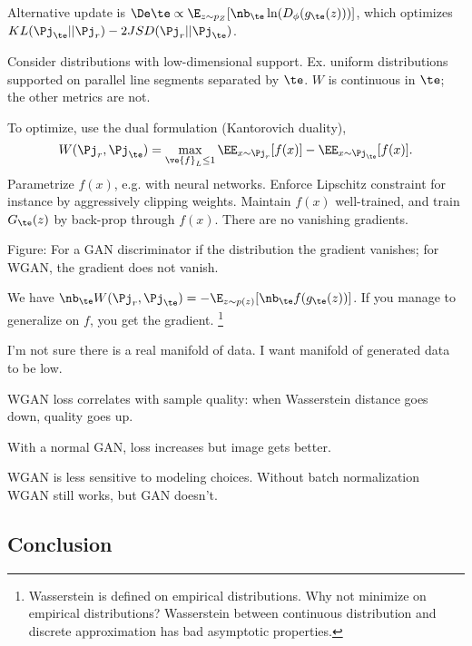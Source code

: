 Alternative update is $\De \te \propto \E_{z\sim p_Z} [\nb_\te \ln(D_\phi(g_\te(z)))]$, which optimizes $KL(\Pj_\te||\Pj_r)-2JSD(\Pj_r||\Pj_\te)$.

Consider distributions with low-dimensional support. Ex. uniform distributions supported on parallel line segments separated by $\te$. $W$ is continuous in $\te$; the other metrics are not.

To optimize, use the dual formulation (Kantorovich duality), 
$$
W(\Pj_r, \Pj_\te) = \max_{\ve{f}_L\le 1} \EE_{x\sim \Pj_r} [f(x)] - \EE_{x\sim \Pj_\te}[f(x)].
$$
Parametrize $f(x)$, e.g. with neural networks. Enforce Lipschitz constraint for instance by aggressively clipping weights. Maintain $f(x)$ well-trained, and train $G_\te(z)$ by back-prop through $f(x)$. There are no vanishing gradients.


Figure: For a GAN discriminator if the distribution the gradient vanishes; for WGAN, the gradient does not vanish.

We have $\nb_\te W(\Pj_r,\Pj_\te) = -\E_{z\sim p(z)} [\nb_\te f(g_\te(z))]$. If you manage to generalize on $f$, you get the gradient.
%
\footnote{Wasserstein is defined on empirical distributions. Why not minimize on empirical distributions? 
Wasserstein between continuous distribution and discrete approximation has bad asymptotic properties.} %

I'm not sure there is a real manifold of data. I want manifold of generated data to be low.

WGAN loss correlates with sample quality: when Wasserstein distance goes down, quality goes up.

With a normal GAN, loss increases but image gets better. 

WGAN is less sensitive to modeling choices. Without batch normalization WGAN still works, but GAN  doesn't. 

\subsection{Conclusion}

